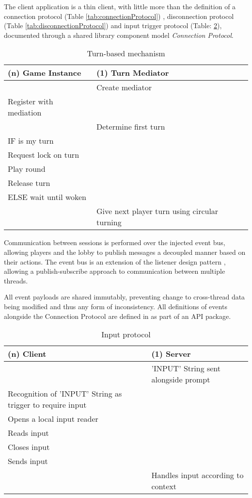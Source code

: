 The client application is a thin client, with little more than the definition of a connection protocol (Table \ref{tab:connectionProtocol}) , disconnection protocol (Table \ref{tab:disconnectionProtocol}) and input trigger protocol (Table: \ref{tab:inputProtocol}), documented through a shared library component model \textit{Connection Protocol}.

\begin{table}[H]
	\centering
	\begin{tabular}{ | l | l | }
		\hline
		(n) Game Instance & (1) Turn Mediator \\
		\hline
		\hline
		 &  Create mediator \\
		\hline
		Register with mediation &  \\
		\hline
		& Determine first turn \\
		\hline 
		IF is my turn & \\
		\hline
		Request lock on turn & \\
		\hline
		Play round & \\
		\hline
		Release turn &  \\
		\hline
		ELSE wait until woken & \\ 
		\hline
		& Give next player turn using circular turning  \\
		\hline
	\end{tabular}
	\caption{Turn-based mechanism}
	\label{tab:turnBasedMechanism}
\end{table}

Communication between sessions is performed over the injected event bus, allowing players and the lobby to publish messages a decoupled manner based on their actions. The event bus is an extension of the listener design pattern \parencite{gamma1994design}, allowing a publish-subscribe approach to communication between multiple threads. 

All event payloads are shared immutably, preventing change to cross-thread data being modified and thus any form of inconsistency. All definitions of events alongside the Connection Protocol are defined in as part of an API package.

\begin{table}[H]
	\centering
	\begin{tabular}{ | l | l | }
		\hline
		(n) Client & (1) Server  \\
		\hline
		\hline
		&  'INPUT' String sent alongside prompt  \\
		\hline
		Recognition of 'INPUT' String as trigger to require input & \\
		\hline
		Opens a local input reader &  \\
		\hline
		Reads input &  \\
		\hline
		Closes input & \\
		\hline
		Sends input & \\
		\hline
		 &  Handles input  according to context \\
		\hline
	\end{tabular}
	\caption{Input protocol}
	\label{tab:inputProtocol}
\end{table}

